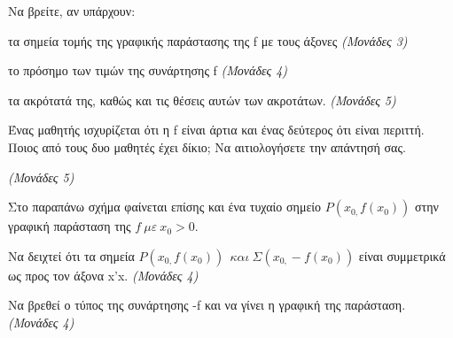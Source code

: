 \documentclass[11pt,a4paper,twoside]{book}
\newcommand{\monades}[1]{\hfill \textit{(Μονάδες #1)}}
\begin{document}
\begin{center}
\end{center}

\begin{alist}
\item Να βρείτε, αν υπάρχουν:

\begin{rlist}
\item τα σημεία τομής της γραφικής παράστασης της f με τους άξονες \monades{3}
\item το πρόσημο των τιμών της συνάρτησης f \monades{4}
\item τα ακρότατά της, καθώς και τις θέσεις αυτών των ακροτάτων. \monades{5}
\end{rlist}

\item Ένας μαθητής ισχυρίζεται ότι η f είναι άρτια και ένας δεύτερος ότι είναι περιττή.
Ποιος από τους δυο μαθητές έχει δίκιο; Να αιτιολογήσετε την απάντησή σας.

\monades{5}

\item Στο παραπάνω σχήμα φαίνεται επίσης και ένα τυχαίο σημείο $Ρ(x_{0,}f(x_{0}))$ στην γραφική παράσταση της $f\ \mu\varepsilon\ x_{0} > 0.$

\begin{rlist}
\item Να δειχτεί ότι τα σημεία $Ρ(x_{0,}f(x_{0}))\ \ \kappa\alpha\iota\ \Sigma(x_{0,} - f(x_{0}))$ είναι συμμετρικά ως προς τον άξονα x'x. \monades{4}
\item Να βρεθεί ο τύπος της συνάρτησης -f και να γίνει η γραφική της παράσταση. \monades{4}
\end{rlist}
\end{alist}
\end{document}
